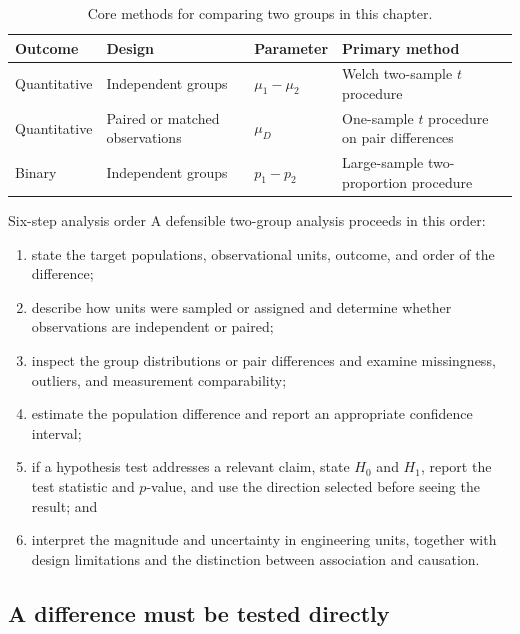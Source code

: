 \begin{table}[htbp]
\centering
\caption{Core methods for comparing two groups in this chapter.}
\label{tab:two-group-method-selection}
\begin{tabularx}{\textwidth}{@{}l>{\raggedright\arraybackslash}X>{\raggedright\arraybackslash}X>{\raggedright\arraybackslash}X@{}}
\toprule
Outcome & Design & Parameter & Primary method \\
\midrule
Quantitative & Independent groups & $\mu_1-\mu_2$ & Welch two-sample $t$ procedure \\
Quantitative & Paired or matched observations & $\mu_D$ & One-sample $t$ procedure on pair differences \\
Binary & Independent groups & $p_1-p_2$ & Large-sample two-proportion procedure \\
\bottomrule
\end{tabularx}
\end{table}

\FloatBarrier

\begin{custombox}{Six-step analysis order}
A defensible two-group analysis proceeds in this order:
\begin{enumerate}
  \item state the target populations, observational units, outcome, and order of the difference;
  \item describe how units were sampled or assigned and determine whether observations are independent or paired;
  \item inspect the group distributions or pair differences and examine missingness, outliers, and measurement comparability;
  \item estimate the population difference and report an appropriate confidence interval;
  \item if a hypothesis test addresses a relevant claim, state $H_0$ and $H_1$, report the test statistic and $p$-value, and use the direction selected before seeing the result; and
  \item interpret the magnitude and uncertainty in engineering units, together with design limitations and the distinction between association and causation.
\end{enumerate}
\end{custombox}

\subsection{A difference must be tested directly}

